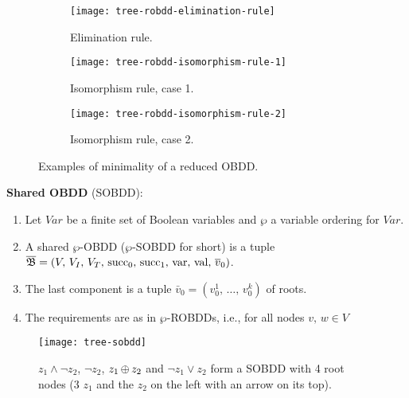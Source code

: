\documentclass[../src/handouts/main.tex]{subfiles}
\begin{document}
\begin{figure}[htbp]
  \centering
  \begin{subfigure}[t]{.45\textwidth}
    \centering
    \texttt{[image: tree-robdd-elimination-rule]}
    \caption{Elimination rule.}
    \label{fig:tree-robdd-elimination-rule}
  \end{subfigure}

  \begin{subfigure}[t]{.45\textwidth}
    \centering
    \texttt{[image: tree-robdd-isomorphism-rule-1]}
    \caption{Isomorphism rule, case 1.}
    \label{fig:tree-robdd-isomorphism-rule-1}
  \end{subfigure}
  \hfill
  \begin{subfigure}[t]{.45\textwidth}
    \centering
    \texttt{[image: tree-robdd-isomorphism-rule-2]}
    \caption{Isomorphism rule, case 2.}
    \label{fig:tree-robdd-isomorphism-rule-2}
  \end{subfigure}

  \caption{Examples of minimality of a reduced OBDD.}
  \label{fig:tree-robdd}
\end{figure}

\textbf{Shared OBDD} (SOBDD):
\begin{enumerate}
  \item Let $Var$ be a finite set of Boolean variables and $\wp$ a variable ordering for $Var$.
  \item A shared $\wp$-OBDD ($\wp$-SOBDD for short) is a tuple $\overline{\mathfrak{B}} = \left( V,\, V_I,\, V_T,\, \operatorname{succ}_0,\, \operatorname{succ}_1,\, \operatorname{var},\, \operatorname{val},\, \overline{v}_0 \right)$.
  \item The last component is a tuple $\bar{v}_0 = \left( v_0^1,\, \ldots,\, v_0^k \right)$ of roots.
  \item The requirements are as in $\wp$-ROBDDs, i.e., for all nodes $v,\, w \in V$
\end{enumerate}

\begin{figure}[htbp]
  \centering
  \texttt{[image: tree-sobdd]}
  \caption{$z_1 \land \neg z_2$, $\neg z_2$, $z_1 \operatorname{\oplus} z_2$ and $\neg z_1 \lor z_2$ form a SOBDD with 4 root nodes (3 $z_1$ and the $z_2$ on the left with an arrow on its top).}
  \label{fig:tree-sobdd}
\end{figure}
\end{document}
